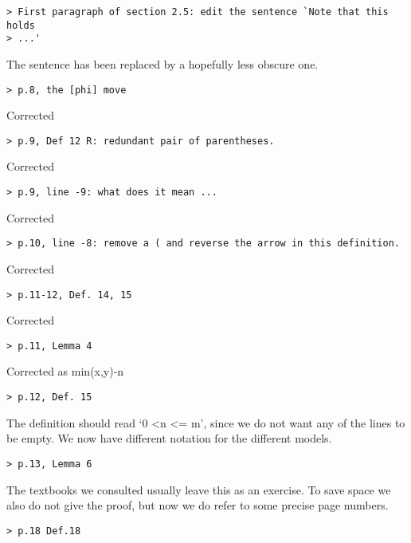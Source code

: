 \documentclass{article}
\begin{document}
\begin{verbatim}
> First paragraph of section 2.5: edit the sentence `Note that this holds
> ...'
\end{verbatim}

The sentence has been replaced by a hopefully less obscure one.

\begin{verbatim}
> p.8, the [phi] move
\end{verbatim}

Corrected

\begin{verbatim}
> p.9, Def 12 R: redundant pair of parentheses.
\end{verbatim}

Corrected

\begin{verbatim}
> p.9, line -9: what does it mean ...
\end{verbatim}

Corrected

\begin{verbatim}
> p.10, line -8: remove a ( and reverse the arrow in this definition.
\end{verbatim}

Corrected

\begin{verbatim}
> p.11-12, Def. 14, 15
\end{verbatim}
Corrected

\begin{verbatim}
> p.11, Lemma 4
\end{verbatim}

Corrected as min(x,y)-n

\begin{verbatim}
> p.12, Def. 15
\end{verbatim}

The definition should read `0 <n <= m', since we do not want any of the
lines to be empty. We now have different notation for the different models.

\begin{verbatim}
> p.13, Lemma 6
\end{verbatim}

The textbooks we consulted usually leave this as an exercise. To save
space we also do not give the proof, but now we do refer to some
precise page numbers.

\begin{verbatim}
> p.18 Def.18
\end{verbatim}
\end{document}
